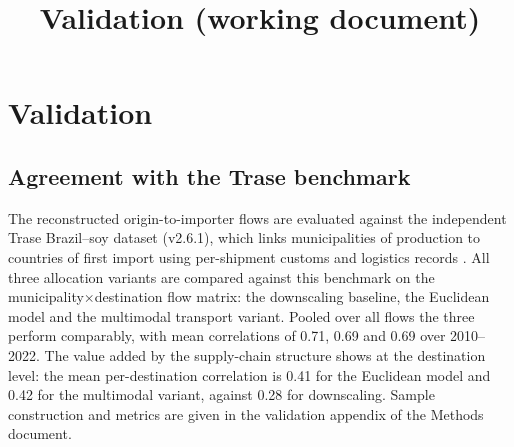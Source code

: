 \documentclass[pdflatex,sn-nature]{sn-jnl}%
\begin{document}
\title[Validation]{Validation (working document)}

\author*[1]{ }



\maketitle

\section{Validation}\label{sec:validation}

\subsection{Agreement with the Trase benchmark}\label{subsec:val-trase}
The reconstructed origin-to-importer flows are evaluated against the
independent Trase Brazil--soy dataset (v2.6.1), which links
municipalities of production to countries of first import using
per-shipment customs and logistics records
\cite{godar2015sei,escobar2020trase}. All three allocation variants are
compared against this benchmark on the
municipality$\times$destination flow matrix: the downscaling baseline,
the Euclidean model and the multimodal transport variant. Pooled over
all flows the three perform comparably, with mean correlations of 0.71,
0.69 and 0.69 over 2010--2022. The value added by the supply-chain
structure shows at the destination level: the mean per-destination
correlation is 0.41 for the Euclidean model and 0.42 for the multimodal
variant, against 0.28 for downscaling. Sample construction and metrics
are given in the validation appendix of the Methods document.
\end{document}
